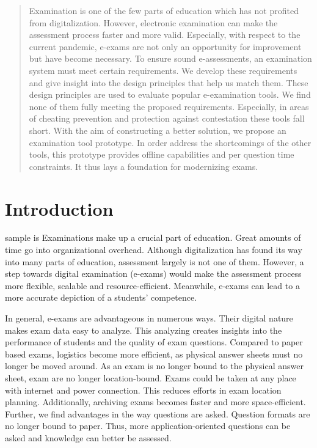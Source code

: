 \def\checkmark{\tikz\fill[scale=0.4](0,.35) -- (.25,0) -- (1,.7) -- (.25,.15) -- cycle;}

\begin{abstract}Examination is one of the few parts of education which has not profited from digitalization. However, electronic examination can make the assessment process faster and more valid. Especially, with respect to the current pandemic, e-exams are not only an opportunity for improvement but have become necessary. To ensure sound e-assessments, an examination system must meet certain requirements. We develop these requirements and give insight into the design principles that help us match them. These design principles are used to evaluate popular e-examination tools. We find none of them fully meeting the proposed requirements. Especially, in areas of cheating prevention and protection against contestation these tools fall short. With the aim of constructing a better solution, we propose an examination tool prototype. In order address the shortcomings of the other tools, this prototype provides offline capabilities and per question time constraints. It thus lays a foundation for modernizing exams.\end{abstract}
\newpage
{}
\printglossaries
\newpage
\tableofcontents

\newpage

\hypertarget{introduction}{%
\section{Introduction}\label{introduction}}

\gls{sample} is Examinations make up a crucial part of education. Great
amounts of time go into organizational overhead. Although digitalization
has found its way into many parts of education, assessment largely is
not one of them. However, a step towards digital examination (e-exams)
would make the assessment process more flexible, scalable and
resource-efficient. Meanwhile, e-exams can lead to a more accurate
depiction of a students' competence.

In general, e-exams are advantageous in numerous ways. Their digital
nature makes exam data easy to analyze. This analyzing creates insights
into the performance of students and the quality of exam questions.
Compared to paper based exams, logistics become more efficient, as
physical answer sheets must no longer be moved around. As an exam is no
longer bound to the physical answer sheet, exam are no longer
location-bound. Exams could be taken at any place with internet and
power connection. This reduces efforts in exam location planning.
Additionally, archiving exams becomes faster and more space-efficient.
Further, we find advantages in the way questions are asked. Question
formats are no longer bound to paper. Thus, more application-oriented
questions can be asked and knowledge can better be assessed.

